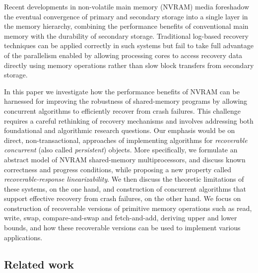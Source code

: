 Recent developments in non-volatile main memory (NVRAM) media foreshadow the eventual convergence of primary and secondary storage into a single layer in the memory hierarchy, combining the performance benefits of conventional main memory with the durability of secondary storage. Traditional log-based recovery techniques can be applied correctly in such systems but fail to take full advantage of the parallelism enabled by allowing processing cores to access recovery data directly using memory operations rather than slow block transfers from secondary storage.

In this paper we investigate how the performance benefits of NVRAM can be harnessed for improving the robustness of shared-memory programs by allowing concurrent algorithms to efficiently recover from crash failures. This challenge requires a careful rethinking of recovery mechanisms and involves addressing both foundational and algorithmic research questions. Our emphasis would be on direct, non-transactional, approaches of implementing algorithms for \emph{recoverable concurrent} (also called \emph{persistent}) objects.
More specifically, we formulate an abstract model of NVRAM shared-memory multiprocessors, and discuss known correctness and progress conditions, while proposing a new property called \textit{recoverable-response linearizability}. We then discuss the theoretic limitations of these systems, on the one hand, and construction of concurrent algorithms that support effective recovery from crash failures, on the other hand. We focus on construction of recoverable versions of primitive memory operations such as read, write, swap, compare-and-swap and fetch-and-add, deriving upper and lower bounds, and how these recoverable versions can be used to implement various applications.




\subsection{Related work}

